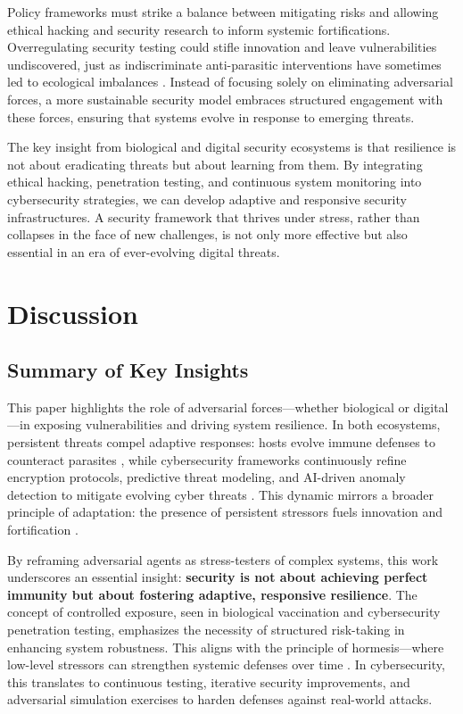 \documentclass{article}
\begin{document}
Policy frameworks must strike a balance between mitigating risks and allowing ethical hacking and security research to inform systemic fortifications. Overregulating security testing could stifle innovation and leave vulnerabilities undiscovered, just as indiscriminate anti-parasitic interventions have sometimes led to ecological imbalances \citep{dobson1989population}. Instead of focusing solely on eliminating adversarial forces, a more sustainable security model embraces structured engagement with these forces, ensuring that systems evolve in response to emerging threats.

The key insight from biological and digital security ecosystems is that resilience is not about eradicating threats but about learning from them. By integrating ethical hacking, penetration testing, and continuous system monitoring into cybersecurity strategies, we can develop adaptive and responsive security infrastructures. A security framework that thrives under stress, rather than collapses in the face of new challenges, is not only more effective but also essential in an era of ever-evolving digital threats.

\section{Discussion}
\subsection{Summary of Key Insights}
This paper highlights the role of adversarial forces—whether biological or digital—in exposing vulnerabilities and driving system resilience. In both ecosystems, persistent threats compel adaptive responses: hosts evolve immune defenses to counteract parasites \citep{anderson1991infectious}, while cybersecurity frameworks continuously refine encryption protocols, predictive threat modeling, and AI-driven anomaly detection to mitigate evolving cyber threats \citep{shostack2014threatmodeling}. This dynamic mirrors a broader principle of adaptation: the presence of persistent stressors fuels innovation and fortification \citep{schneier2000secrets}.

By reframing adversarial agents as stress-testers of complex systems, this work underscores an essential insight: \textbf{security is not about achieving perfect immunity but about fostering adaptive, responsive resilience}. The concept of controlled exposure, seen in biological vaccination and cybersecurity penetration testing, emphasizes the necessity of structured risk-taking in enhancing system robustness. This aligns with the principle of hormesis—where low-level stressors can strengthen systemic defenses over time \citep{calabrese2019hormesis}. In cybersecurity, this translates to continuous testing, iterative security improvements, and adversarial simulation exercises to harden defenses against real-world attacks.
\end{document}
